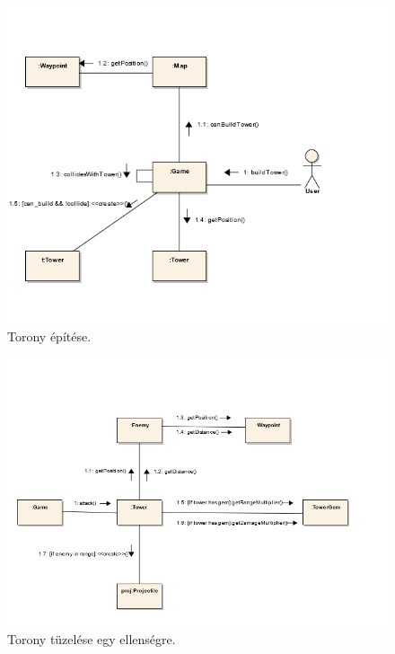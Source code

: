 \begin{figure}[H]
\begin{center}
\includegraphics{images/ch05/buildTowerKomm.png}
\caption{Torony építése.}
\label{fig:buildTowerKomm}
\end{center}
\end{figure}

\begin{figure}[H]
\begin{center}
\includegraphics{images/ch05/attackKomm.png}
\caption{Torony tüzelése egy ellenségre.}
\label{fig:attackKomm}
\end{center}
\end{figure}

